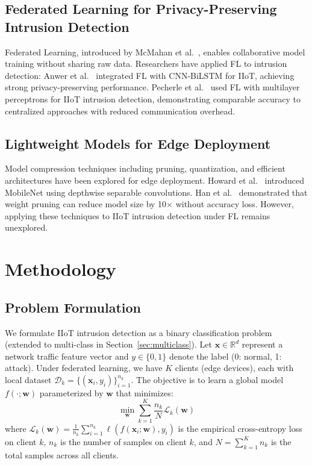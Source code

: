 \documentclass[10pt,journal]{IEEEtran}
\begin{document}
\subsection{Federated Learning for Privacy-Preserving Intrusion Detection}

Federated Learning, introduced by McMahan et al.~\cite{mcmahan2017communication}, enables collaborative model training without sharing raw data. Researchers have applied FL to intrusion detection: Anwer et al.~\cite{anwer2025advanced} integrated FL with CNN-BiLSTM for IIoT, achieving strong privacy-preserving performance. Pecherle et al.~\cite{pecherle2026federated} used FL with multilayer perceptrons for IIoT intrusion detection, demonstrating comparable accuracy to centralized approaches with reduced communication overhead.

\subsection{Lightweight Models for Edge Deployment}

Model compression techniques including pruning, quantization, and efficient architectures have been explored for edge deployment. Howard et al.~\cite{howard2017mobilenets} introduced MobileNet using depthwise separable convolutions. Han et al.~\cite{han2016deep} demonstrated that weight pruning can reduce model size by 10$\times$ without accuracy loss. However, applying these techniques to IIoT intrusion detection under FL remains unexplored.

\section{Methodology}
\label{sec:method}

\subsection{Problem Formulation}

We formulate IIoT intrusion detection as a binary classification problem (extended to multi-class in Section~\ref{sec:multiclass}). Let $\mathbf{x} \in \mathbb{R}^d$ represent a network traffic feature vector and $y \in \{0, 1\}$ denote the label (0: normal, 1: attack). Under federated learning, we have $K$ clients (edge devices), each with local dataset $\mathcal{D}_k = \{(\mathbf{x}_i, y_i)\}_{i=1}^{n_k}$. The objective is to learn a global model $f(\cdot; \mathbf{w})$ parameterized by $\mathbf{w}$ that minimizes:
\begin{equation}
\min_{\mathbf{w}} \sum_{k=1}^{K} \frac{n_k}{N} \mathcal{L}_k(\mathbf{w})
\label{eq:fl_objective}
\end{equation}
where $\mathcal{L}_k(\mathbf{w}) = \frac{1}{n_k} \sum_{i=1}^{n_k} \ell(f(\mathbf{x}_i; \mathbf{w}), y_i)$ is the empirical cross-entropy loss on client $k$, $n_k$ is the number of samples on client $k$, and $N = \sum_{k=1}^{K} n_k$ is the total samples across all clients.
\end{document}
